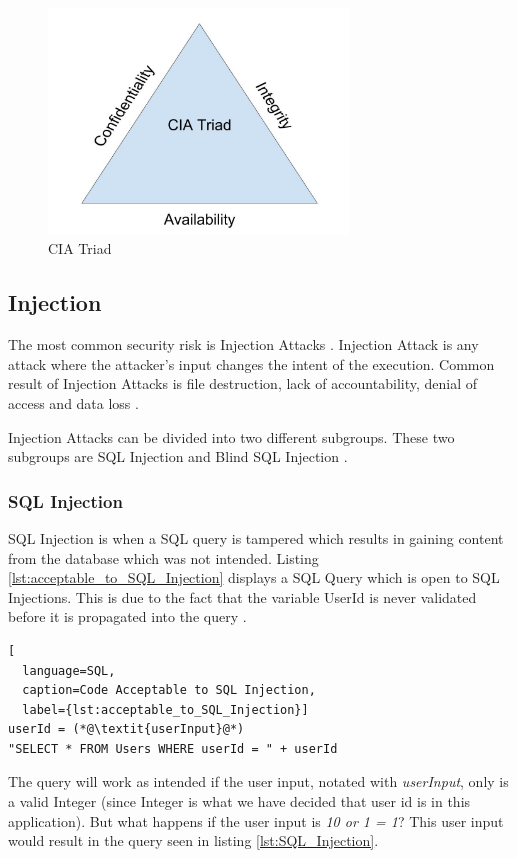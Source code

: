 \begin{figure}
  \centering
  \includegraphics[height=6cm]{images/CIATriad.jpg}
  \caption{CIA Triad}
  \label{fig:CIATriad}
\end{figure}


\subsection{Injection}
The most common security risk is Injection Attacks \parencite{OWASP2017}. Injection Attack is any attack where the attacker's input changes the intent of the execution. Common result of Injection Attacks is file destruction, lack of accountability, denial of access and data loss \parencite{Secure_Web}.

Injection Attacks can be divided into two different subgroups. These two subgroups are SQL Injection and Blind SQL Injection \parencite{Secure_Web}.


\subsubsection{SQL Injection}
SQL Injection is when a SQL query is tampered which results in gaining content from the database which was not intended. Listing \ref{lst:acceptable_to_SQL_Injection} displays a SQL Query which is open to SQL Injections. This is due to the fact that the variable UserId is never validated before it is propagated into the query \parencite{JustinClarke-Salt2009SIAa, Secure_Web}.

\hfill
\begin{lstlisting}[
  language=SQL,
  caption=Code Acceptable to SQL Injection,
  label={lst:acceptable_to_SQL_Injection}]
userId = (*@\textit{userInput}@*)
"SELECT * FROM Users WHERE userId = " + userId
\end{lstlisting}
\hfill

The query will work as intended if the user input, notated with \textit{userInput}, only is a valid Integer (since Integer is what we have decided that user id is in this application). But what happens if the user input is \textit{10 or 1 = 1}? This user input would result in the query seen in listing \ref{lst:SQL_Injection}.

